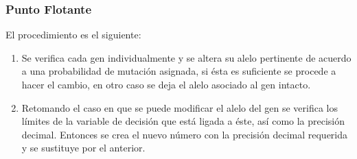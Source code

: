 \documentclass[class=report, crop=false]{standalone}
\begin{document}
\subsubsection{Punto Flotante}
El procedimiento es el siguiente:

\begin{enumerate}
\item Se verifica cada gen individualmente y se altera su 
alelo pertinente de acuerdo a una probabilidad de mutación 
asignada, si ésta es suficiente se procede a hacer el cambio, 
en otro caso se deja el alelo asociado al gen intacto.
\item Retomando el caso en que se puede modificar el alelo 
del gen se verifica los límites de la variable de decisión 
que está ligada a éste, así como la precisión decimal. 
Entonces se crea el nuevo número con la precisión decimal 
requerida y se sustituye por el anterior.
\end{enumerate}

\end{document}
